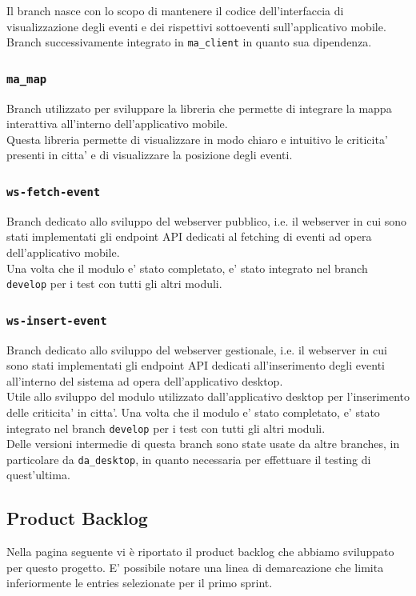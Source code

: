 \documentclass{article}
\begin{document}
Il branch nasce con lo scopo di mantenere il codice dell'interfaccia di visualizzazione degli eventi e dei rispettivi sottoeventi sull'applicativo mobile.
Branch successivamente integrato in \texttt{ma\_client} in quanto sua dipendenza.

\subsubsection{\texttt{ma\_map}}

Branch utilizzato per sviluppare la libreria che permette di integrare la mappa interattiva all'interno dell'applicativo mobile.\\
Questa libreria permette di visualizzare in modo chiaro e intuitivo le criticita' presenti in citta' e di visualizzare la posizione degli eventi.

\subsubsection{\texttt{ws-fetch-event}}

Branch dedicato allo sviluppo del webserver pubblico, i.e. il webserver in cui sono stati implementati gli endpoint API dedicati al fetching di eventi ad opera dell'applicativo mobile.\\
Una volta che il modulo e' stato completato, e' stato integrato nel branch \texttt{develop} per i test con tutti gli altri moduli.

\subsubsection{\texttt{ws-insert-event}}

Branch dedicato allo sviluppo del webserver gestionale, i.e. il webserver in cui sono stati implementati gli endpoint API dedicati all'inserimento degli eventi all'interno del sistema ad opera dell'applicativo desktop. \\
Utile allo sviluppo del modulo utilizzato dall'applicativo desktop per l'inserimento delle criticita' in citta'.
Una volta che il modulo e' stato completato, e' stato integrato nel branch \texttt{develop} per i test con tutti gli altri moduli.\\
Delle versioni intermedie di questa branch sono state usate da altre branches, in particolare da \texttt{da\_desktop}, in quanto necessaria per effettuare il testing di quest'ultima.

\clearpage

\subsection{Product Backlog}
Nella pagina seguente vi è riportato il product backlog che abbiamo sviluppato per questo progetto. E' possibile notare una linea di demarcazione che limita inferiormente le entries selezionate per il primo sprint.
\end{document}
